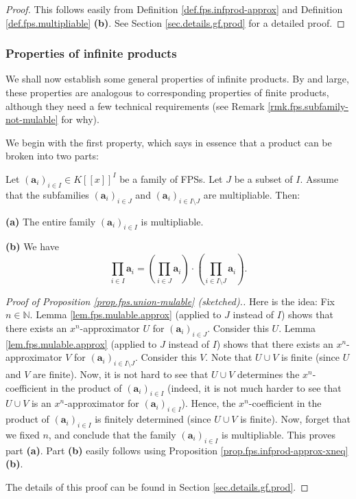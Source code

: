 \begin{proof}
This follows easily from Definition \ref{def.fps.infprod-approx} and
Definition \ref{def.fps.multipliable} \textbf{(b)}. See Section
\ref{sec.details.gf.prod} for a detailed proof.
\end{proof}

\subsubsection{Properties of infinite products}

We shall now establish some general properties of infinite products. By and
large, these properties are analogous to corresponding properties of finite
products, although they need a few technical requirements (see Remark
\ref{rmk.fps.subfamily-not-mulable} for why).

We begin with the first property, which says in essence that a product can be
broken into two parts:

\begin{proposition}
\label{prop.fps.union-mulable}Let $\left(  \mathbf{a}_{i}\right)  _{i\in I}\in
K\left[  \left[  x\right]  \right]  ^{I}$ be a family of FPSs. Let $J$ be a
subset of $I$. Assume that the subfamilies $\left(  \mathbf{a}_{i}\right)
_{i\in J}$ and $\left(  \mathbf{a}_{i}\right)  _{i\in I\setminus J}$ are
multipliable. Then: \medskip

\textbf{(a)} The entire family $\left(  \mathbf{a}_{i}\right)  _{i\in I}$ is
multipliable. \medskip

\textbf{(b)} We have
\[
\prod_{i\in I}\mathbf{a}_{i}=\left(  \prod_{i\in J}\mathbf{a}_{i}\right)
\cdot\left(  \prod_{i\in I\setminus J}\mathbf{a}_{i}\right)  .
\]

\end{proposition}

\begin{proof}
[Proof of Proposition \ref{prop.fps.union-mulable} (sketched).]Here is the
idea: Fix $n\in\mathbb{N}$. Lemma \ref{lem.fps.mulable.approx} (applied to $J$
instead of $I$) shows that there exists an $x^{n}$-approximator $U$ for
$\left(  \mathbf{a}_{i}\right)  _{i\in J}$. Consider this $U$. Lemma
\ref{lem.fps.mulable.approx} (applied to $J$ instead of $I$) shows that there
exists an $x^{n}$-approximator $V$ for $\left(  \mathbf{a}_{i}\right)  _{i\in
I\setminus J}$. Consider this $V$. Note that $U\cup V$ is finite (since $U$
and $V$ are finite). Now, it is not hard to see that $U\cup V$ determines the
$x^{n}$-coefficient in the product of $\left(  \mathbf{a}_{i}\right)  _{i\in
I}$ (indeed, it is not much harder to see that $U\cup V$ is an $x^{n}%
$-approximator for $\left(  \mathbf{a}_{i}\right)  _{i\in I}$). Hence, the
$x^{n}$-coefficient in the product of $\left(  \mathbf{a}_{i}\right)  _{i\in
I}$ is finitely determined (since $U\cup V$ is finite). Now, forget that we
fixed $n$, and conclude that the family $\left(  \mathbf{a}_{i}\right)  _{i\in
I}$ is multipliable. This proves part \textbf{(a)}. Part \textbf{(b)} easily
follows using Proposition \ref{prop.fps.infprod-approx-xneq} \textbf{(b)}.

The details of this proof can be found in Section \ref{sec.details.gf.prod}.
\end{proof}


